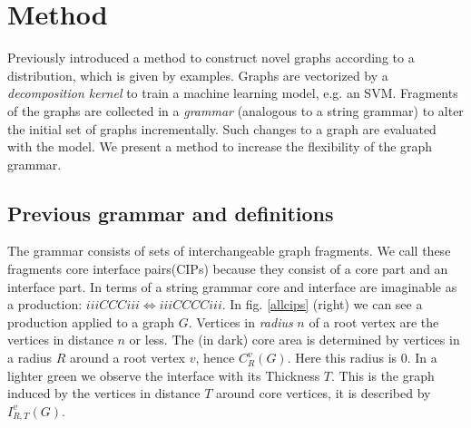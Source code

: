 \documentclass{article}
\begin{document}
\section{Method}

Previously \cite{costa16} introduced a method
to construct novel graphs according to a distribution, which is given by
examples. Graphs are vectorized by a \emph{decomposition kernel}
to train a machine learning model, e.g. an SVM.
Fragments of the graphs are collected in 
a \emph{grammar} (analogous to a string grammar) to alter the initial
set of graphs incrementally. Such changes to a graph are evaluated with the
model. 
We present a method to increase the flexibility of the graph grammar.

\subsection{Previous grammar and definitions}

The grammar consists of sets of interchangeable graph fragments.
We call these fragments core interface pairs(CIPs) because 
they consist of a core part and an interface part.
In terms of a string grammar core and interface are imaginable 
as a production: $iiiCCCiii \Longleftrightarrow iiiCCCCiii$.
In fig. \ref{allcips} (right) we can see a production applied to a graph $G$.
Vertices in \emph{radius} $n$ of a root vertex are the vertices in distance $n$
or less. The (in dark) core area is determined by vertices in a radius $R$
around a root vertex $v$, hence $C_{R}^v(G)$. Here this radius is $0$. In a
lighter green we observe the interface with its Thickness $T$. This is the graph
induced by the vertices in distance $T$ around core vertices, it is
described by $I_{R,T}^v(G)$.
\end{document}
